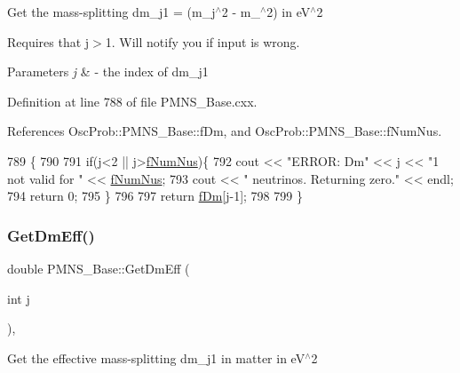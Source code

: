 Get the mass-\/splitting dm\+\_\+j1 = (m\+\_\+j$^\wedge$2 -\/ m\+\_$^\wedge$2) in e\+V$^\wedge$2

Requires that j$>$1. Will notify you if input is wrong.


\begin{DoxyParams}{Parameters}
{\em j} & -\/ the index of dm\+\_\+j1 \\
\hline
\end{DoxyParams}


Definition at line 788 of file P\+M\+N\+S\+\_\+\+Base.\+cxx.



References Osc\+Prob\+::\+P\+M\+N\+S\+\_\+\+Base\+::f\+Dm, and Osc\+Prob\+::\+P\+M\+N\+S\+\_\+\+Base\+::f\+Num\+Nus.


\begin{DoxyCode}
789 \{
790 
791   \textcolor{keywordflow}{if}(j<2 || j>\hyperlink{classOscProb_1_1PMNS__Base_a24bb74bed63569dfe88b18fa6a08060e}{fNumNus})\{
792     cout << \textcolor{stringliteral}{"ERROR: Dm"} << j << \textcolor{stringliteral}{"1 not valid for "} << \hyperlink{classOscProb_1_1PMNS__Base_a24bb74bed63569dfe88b18fa6a08060e}{fNumNus};
793     cout << \textcolor{stringliteral}{" neutrinos. Returning zero."} << endl;
794     \textcolor{keywordflow}{return} 0;
795   \}
796 
797   \textcolor{keywordflow}{return} \hyperlink{classOscProb_1_1PMNS__Base_a406a31c3b5d620e5a0cace5b411f9f70}{fDm}[j-1];
798 
799 \}
\end{DoxyCode}
\mbox{\label{classOscProb_1_1PMNS__Base_a4ea861a6707ce1be3a54aad2b60f8632}} 
\subsubsection{\texorpdfstring{Get\+Dm\+Eff()}{GetDmEff()}}
{\footnotesize\ttfamily double P\+M\+N\+S\+\_\+\+Base\+::\+Get\+Dm\+Eff (\begin{DoxyParamCaption}\item[{int}]{j }\end{DoxyParamCaption})\hspace{0.3cm}{\ttfamily [virtual]}, {\ttfamily [inherited]}}

Get the effective mass-\/splitting dm\+\_\+j1 in matter in e\+V$^\wedge$2

